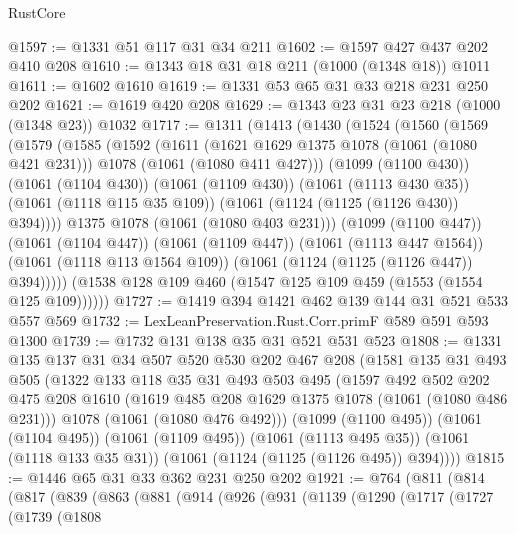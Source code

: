 \begin{lexlean}{RustCore}
\begin{coremodule}
@1597 := @1331 @51 @117 @31 @34 @211
@1602 := @1597 @427 @437 @202 @410 @208
@1610 := @1343 @18 @31 @18 @211 (@1000 (@1348 @18)) @1011
@1611 := @1602 @1610
@1619 := @1331 @53 @65 @31 @33 @218 @231 @250 @202
@1621 := @1619 @420 @208
@1629 := @1343 @23 @31 @23 @218 (@1000 (@1348 @23)) @1032
@1717 := @1311
    (@1413
      (@1430
        (@1524
          (@1560
            (@1569
              (@1579
                (@1585
                  (@1592
                    (@1611
                      (@1621 @1629 @1375 @1078 (@1061 (@1080 @421 @231)))
                      @1078
                      (@1061 (@1080 @411 @427)))
                    (@1099 (@1100 @430))
                    (@1061 (@1104 @430))
                    (@1061 (@1109 @430))
                    (@1061 (@1113 @430 @35))
                    (@1061 (@1118 @115 @35 @109))
                    (@1061 (@1124 (@1125 (@1126 @430)) @394))))
                @1375
                @1078
                (@1061 (@1080 @403 @231)))
              (@1099 (@1100 @447))
              (@1061 (@1104 @447))
              (@1061 (@1109 @447))
              (@1061 (@1113 @447 @1564))
              (@1061 (@1118 @113 @1564 @109))
              (@1061 (@1124 (@1125 (@1126 @447)) @394)))))
        (@1538 @128 @109 @460 (@1547 @125 @109 @459 (@1553 (@1554 @125 @109))))))
@1727 := @1419 @394 @1421 @462 @139 @144 @31 @521 @533 @557 @569
@1732 := LexLeanPreservation.Rust.Corr.primF @589 @591 @593 @1300
@1739 := @1732 @131 @138 @35 @31 @521 @531 @523
@1808 := @1331
    @135
    @137
    @31
    @34
    @507
    @520
    @530
    @202
    @467
    @208
    (@1581
      @135
      @31
      @493
      @505
      (@1322
        @133
        @118
        @35
        @31
        @493
        @503
        @495
        (@1597
          @492
          @502
          @202
          @475
          @208
          @1610
          (@1619 @485 @208 @1629 @1375 @1078 (@1061 (@1080 @486 @231)))
          @1078
          (@1061 (@1080 @476 @492)))
        (@1099 (@1100 @495))
        (@1061 (@1104 @495))
        (@1061 (@1109 @495))
        (@1061 (@1113 @495 @35))
        (@1061 (@1118 @133 @35 @31))
        (@1061 (@1124 (@1125 (@1126 @495)) @394))))
@1815 := @1446 @65 @31 @33 @362 @231 @250 @202
@1921 := @764
    (@811
      (@814
        (@817
          (@839
            (@863
              (@881
                (@914
                  (@926
                    (@931
                      (@1139
                        (@1290
                          (@1717
                            (@1727
                              (@1739
                                (@1808

\end{coremodule}
\end{lexlean}
